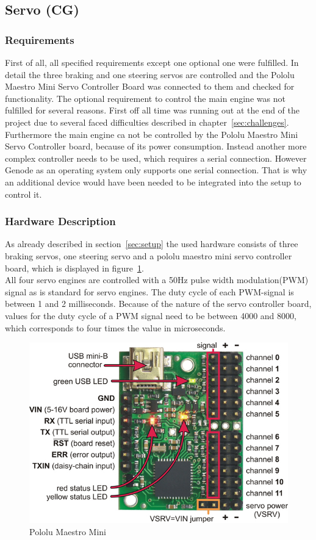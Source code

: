 \subsection{Servo (CG)}
\label{sec:servo}

\subsubsection{Requirements}
First of all, all specified requirements except one optional one were fulfilled. In detail the three braking and one steering servos are controlled and the Pololu Maestro Mini Servo Controller Board was connected to them and checked for functionality. The optional requirement to control the main engine was not fulfilled for several reasons. First off all time was running out at the end of the project due to several faced difficulties described in chapter~\ref{sec:challenges}. Furthermore the main engine ca not be controlled by the Pololu Maestro Mini Servo Controller board, because of its power consumption. Instead another more complex controller needs to be used, which requires a serial connection. However Genode as an operating system only supports one serial connection. That is why an additional device would have been needed to be integrated into the setup to control it.

\subsubsection{Hardware Description}
As already described in section~\ref{sec:setup} the used hardware consists of three braking servos, one steering servo and a pololu maestro mini servo controller board, which is displayed in figure~\ref{fig:pololu}.\\

All four servo engines are controlled with a 50Hz pulse width modulation(PWM) signal as is standard for servo engines. The duty cycle of each PWM-signal is between 1 and 2 milliseconds. Because of the nature of the servo controller board, values for the duty cycle of a PWM signal need to be between 4000 and 8000, which corresponds to four times the value in microseconds.\\

\begin{figure}[h!tb]
	\centering
    \includegraphics[width=0.7\linewidth]{images/pololu}
    \caption{Pololu Maestro Mini}
    \label{fig:pololu}
\end{figure}

